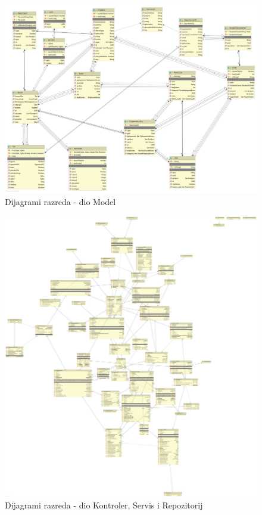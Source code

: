 			\begin{figure}[H]
				\includegraphics[scale=0.25]{dijagrami/classDiagramModel.png} %
				\centering
				\caption{Dijagrami razreda - dio Model}
				\label{fig:model}
			\end{figure}
		
			\begin{figure}[H]
				\includegraphics[scale=0.11]{dijagrami/classDiagramCSR.png} %
				\centering
				\caption{Dijagrami razreda - dio Kontroler, Servis i Repozitorij}
				\label{fig:controller}
			\end{figure}
		
